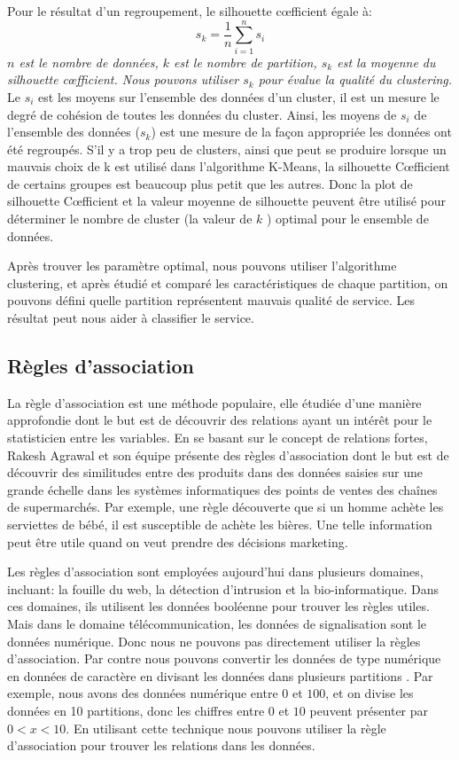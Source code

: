 \begin{enumerate}
Pour le résultat d'un regroupement, le silhouette c\oe fficient égale à:
$$s_{k}=\frac{1}{n}\sum_{i=1}^n s_{i}$$
\emph{$n$ est le nombre de données, $k$ est le nombre de partition, $s_{k}$ est la moyenne du silhouette c\oe fficient. Nous pouvons utiliser $s_{k}$ pour évalue la qualité du clustering.}
\newline
\newline
Le $s_{i}$ est les moyens sur l'ensemble des données d'un cluster, il est un mesure le degré de cohésion de toutes les données du cluster. Ainsi, les moyens de $s_{i}$ de l'ensemble des données ($s_{k}$) est une mesure de la façon appropriée les données ont été regroupés. S'il y a trop peu de clusters, ainsi que peut se produire lorsque un mauvais choix de k est utilisé dans l'algorithme K-Means, la silhouette C\oe fficient de certains groupes est beaucoup plus petit que les autres. Donc la plot de silhouette C\oe fficient et la valeur moyenne de silhouette peuvent être utilisé pour déterminer le nombre de cluster (la valeur de $k$ ) optimal pour le ensemble de données.
\end{enumerate} 

Après trouver les paramètre optimal, nous pouvons utiliser l'algorithme clustering, et après étudié et comparé les caractéristiques de chaque partition, on pouvons défini quelle partition représentent mauvais qualité de service. Les résultat peut nous aider à classifier le service. 

\subsection{Règles d'association}
La règle d'association est une méthode populaire, elle étudiée d'une manière approfondie dont le but est de découvrir des relations ayant un intérêt pour le statisticien entre les variables. En se basant sur le concept de relations fortes, Rakesh Agrawal et son équipe présente des règles d'association dont le but est de découvrir des similitudes entre des produits dans des données saisies sur une grande échelle dans les systèmes informatiques des points de ventes des chaînes de supermarchés. Par exemple, une règle découverte que si un homme achète les serviettes de bébé, il est susceptible de achète les bières. Une telle information peut être utile quand on veut prendre des décisions marketing.

Les règles d'association sont employées aujourd'hui dans plusieurs domaines, incluant: la fouille du web, la détection d'intrusion et la bio-informatique.  Dans ces domaines, ils utilisent les données booléenne pour trouver les règles utiles. Mais dans le domaine télécommunication, les données de signalisation sont le données numérique. Donc nous ne pouvons pas directement utiliser la règles d'association. Par contre nous pouvons convertir les données de type numérique en données de caractère en divisant les données dans plusieurs partitions \cite{AR}. Par exemple, nous avons des données numérique entre $0$ et $100$, et on divise les données en 10 partitions, donc les chiffres entre $0$ et $10$ peuvent présenter par $0<x<10$. En utilisant cette technique nous pouvons utiliser la règle d'association pour trouver les relations dans les données.


